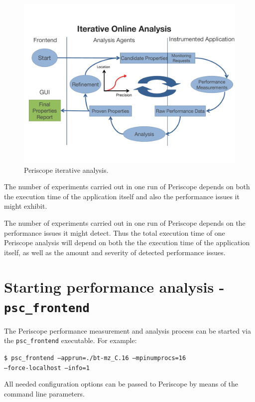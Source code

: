 \documentclass[11pt,oneside,a4paper]{book}
\newenvironment{code}%
{
\addtolength{\leftskip}{0.5cm}}%
{

}
\begin{document}
\begin{figure}[bth]
	\includegraphics[width=\linewidth]{images/Periscope-iterative-analysis-slide}
	\caption{Periscope iterative analysis.}
	\label{fig:analysis-flow}
\end{figure}

The number of experiments carried out in one run of Periscope depends on both the execution time of the application itself and also the performance issues it might exhibit.

The number of experiments carried out in one run of Periscope depends on  the performance issues it might detect. Thus the total execution time of one Periscope analysis will depend on both the the execution time of the application itself, as well as the amount and severity of detected performance issues.


\section{Starting performance analysis - \texttt{psc\_frontend}}
The Periscope performance measurement and analysis process can be started via the \texttt{psc\_frontend} executable. For example:

\begin{code}
\texttt{\$ psc\_frontend --apprun=./bt-mz\_C.16 --mpinumprocs=16 \\--force-localhost --info=1}
\end{code}

All needed configuration options can be passed to Periscope by means of the command line parameters.
\end{document}
